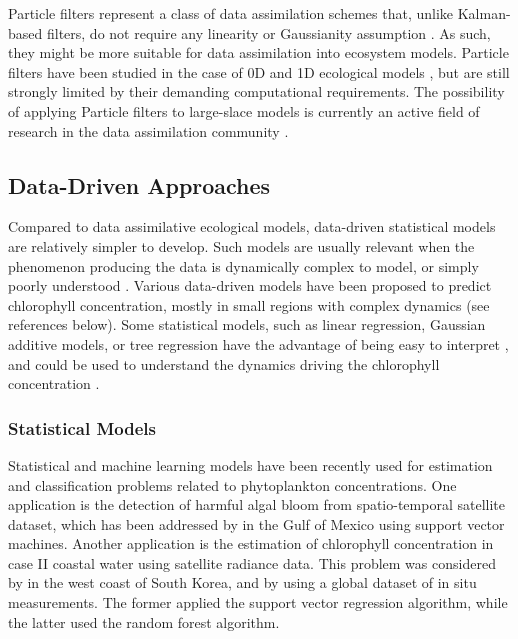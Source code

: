 Particle filters represent a class of data assimilation schemes that, unlike
Kalman-based filters, do not require any linearity or Gaussianity assumption
\citep{Edwards2015}. As such, they might be more suitable for data assimilation
into ecosystem models. Particle filters have been studied in the case of 0D and 1D
ecological models \citep{Edwards2015}, but are still strongly limited by their
demanding computational requirements. The possibility of applying Particle
filters to large-slace models is currently an active field of research in the
data assimilation community \citep{Edwards2015}.


\subsection{Data-Driven Approaches}

Compared to data assimilative ecological models, data-driven statistical models
are relatively simpler to develop. Such models are usually
relevant when the phenomenon
producing the data is dynamically complex to model, or simply poorly understood
\citep{Gareth2013}. Various data-driven models have been proposed
to predict chlorophyll
concentration, mostly in small regions with complex dynamics (see references
below). Some statistical models, such as linear regression, Gaussian additive
models, or tree regression have the advantage of being easy to interpret
\citep{Gareth2013}, and could be used to understand the dynamics driving the
chlorophyll concentration \citep{Raitsos2012}.

\subsubsection{Statistical Models}

Statistical and machine learning models have been recently used for estimation and
classification problems related to phytoplankton concentrations. One
application is the detection of harmful algal bloom from spatio-temporal
satellite dataset, which has been addressed by \citet{Gokaraju2011} in the Gulf
of Mexico using support vector machines. Another application is the estimation
of chlorophyll concentration in case II coastal water using satellite radiance
data. This problem was considered by \citet{Kim2014} in the west coast of
South Korea, and by \citet{Camps-Valls2006} using a global dataset of in situ
measurements.  The former applied the support vector regression algorithm, while
the latter used the random forest algorithm.


